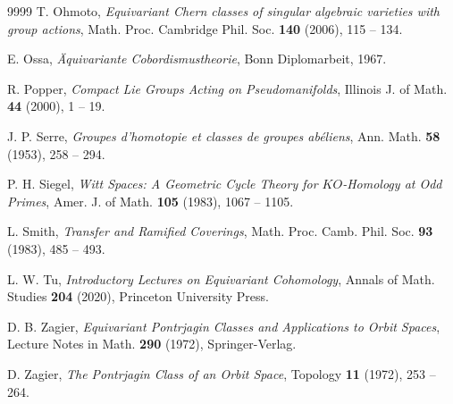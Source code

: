 \documentclass{amsart}
\theoremstyle{definition}
\theoremstyle{remark}
\begin{document}
\begin{thebibliography}{9999}
 T. Ohmoto, 
 {\em Equivariant Chern classes of singular algebraic varieties 
   with group actions}, 
 Math. Proc. Cambridge Phil. Soc. \textbf{140} (2006), 115 -- 134.

 E. Ossa,
 {\em \"Aquivariante Cobordismustheorie},
 Bonn Diplomarbeit, 1967.
           
 R. Popper,
 {\em Compact Lie Groups Acting on Pseudomanifolds},
 Illinois J. of Math. \textbf{44} (2000), 1 -- 19.      
            
 J. P. Serre, 
 {\em Groupes d’homotopie et classes de groupes abéliens}, 
 Ann. Math. \textbf{58} (1953), 258 -- 294.    
            
 P. H. Siegel,
 {\em Witt Spaces: A Geometric Cycle Theory for $KO$-Homology at Odd Primes},
 Amer. J. of Math. \textbf{105} (1983), 1067 -- 1105.  
    
 L. Smith,
 {\em Transfer and Ramified Coverings},
 Math. Proc. Camb. Phil. Soc. \textbf{93} (1983), 485 -- 493.    
      
 L. W. Tu,
 {\em Introductory Lectures on Equivariant Cohomology},
 Annals of Math. Studies \textbf{204} (2020), Princeton University Press.  
    
 D. B. Zagier,
 {\em Equivariant Pontrjagin Classes and Applications to Orbit Spaces},
 Lecture Notes in Math. \textbf{290} (1972), Springer-Verlag.
   
 D. Zagier,
 {\em The Pontrjagin Class of an Orbit Space},
 Topology \textbf{11} (1972), 253 -- 264.   
   
\end{thebibliography}
\end{document}
